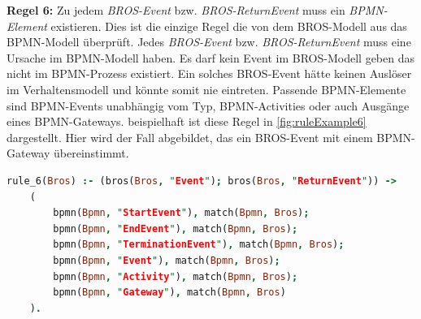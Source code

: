 \textbf{Regel 6:}
Zu jedem \emph{BROS-Event} bzw. \emph{BROS-ReturnEvent} muss ein \emph{BPMN-Element} existieren.
Dies ist die einzige Regel die von dem BROS-Modell aus das BPMN-Modell überprüft.
Jedes \emph{BROS-Event} bzw. \emph{BROS-ReturnEvent} muss eine Ursache im BPMN-Modell haben.
Es darf kein Event im BROS-Modell geben das nicht im BPMN-Prozess existiert.
Ein solches BROS-Event hätte keinen Auslöser im Verhaltensmodell und könnte somit nie eintreten.
Passende BPMN-Elemente sind BPMN-Events unabhängig vom Typ, BPMN-Activities oder auch Ausgänge eines BPMN-Gateways.
beispielhaft ist diese Regel in \cref{fig:ruleExample6} dargestellt.
Hier wird der Fall abgebildet, das ein BROS-Event mit einem BPMN-Gateway übereinstimmt.

\begin{lstlisting}[language=Prolog, caption=Formalisierung der Regel 6, label=lst:rule_6]
rule_6(Bros) :- (bros(Bros, "Event"); bros(Bros, "ReturnEvent")) ->
    (
        bpmn(Bpmn, "StartEvent"), match(Bpmn, Bros);
        bpmn(Bpmn, "EndEvent"), match(Bpmn, Bros);
        bpmn(Bpmn, "TerminationEvent"), match(Bpmn, Bros);
        bpmn(Bpmn, "Event"), match(Bpmn, Bros);
        bpmn(Bpmn, "Activity"), match(Bpmn, Bros);
        bpmn(Bpmn, "Gateway"), match(Bpmn, Bros)
    ).
\end{lstlisting}

